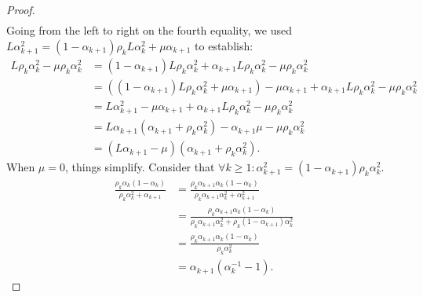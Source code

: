 \documentclass[12pt]{article}
\begin{document}
\begin{proof}
\begin{align*}
            \end{align*}
            Going from the left to right on the fourth equality, we used $L\alpha_{k + 1}^2 = (1 - \alpha_{k + 1})\rho_kL\alpha_k^2 + \mu \alpha_{k + 1}$ to establish: 
            \begin{align*}
                L \rho_k \alpha_k^2 - \mu \rho_k \alpha_k^2 
                &= 
                (1 - \alpha_{k + 1})L \rho_k \alpha_k^2 + \alpha_{k + 1} L \rho_k \alpha_k^2 - \mu \rho_k \alpha_k^2
                \\
                &= 
                ((1 - \alpha_{k + 1})L \rho_k \alpha_k^2 + \mu \alpha_{k + 1}) - \mu\alpha_{k + 1} + \alpha_{k + 1} L \rho_k \alpha_k^2 - \mu \rho_k \alpha_k^2
                \\
                &= L \alpha_{k + 1}^2 - \mu\alpha_{k + 1} + \alpha_{k + 1}L\rho_k\alpha_k^2 - \mu \rho_k \alpha_k^2
                \\
                &= 
                L\alpha_{k + 1}(\alpha_{k + 1} + \rho_k \alpha_k^2) - \alpha_{k + 1}\mu - \mu \rho_k \alpha_k^2
                \\
                &= (L \alpha_{k + 1} - \mu)(\alpha_{k + 1} + \rho_k \alpha_k^2). 
            \end{align*}
            When $\mu = 0$, things simplify. 
            Consider that $\forall k \ge 1: \alpha_{k + 1}^2 = (1 - \alpha_{k + 1})\rho_k\alpha_k^2$. 
            \begin{align*}
                \frac{\rho_k\alpha_k(1 - \alpha_k)}{\rho_k\alpha_k^2 + \alpha_{k + 1}}
                &= 
                \frac{\rho_k\alpha_{k + 1}\alpha_k(1 - \alpha_k)}
                {\rho_k\alpha_{k + 1}\alpha_k^2 + \alpha_{k + 1}^2}
                \\
                &= 
                \frac{\rho_k\alpha_{k + 1}\alpha_k(1 - \alpha_k)}
                {\rho_k\alpha_{k + 1}\alpha_k^2 + \rho_k(1 - \alpha_{k + 1})\alpha_k^2}
                \\
                &= \frac{\rho_k\alpha_{k + 1}\alpha_k(1 - \alpha_k)}{\rho_k\alpha_k^2}
                \\
                &= \alpha_{k + 1}(\alpha_k^{-1} - 1). 
            \end{align*}
        \end{proof}
\end{document}

